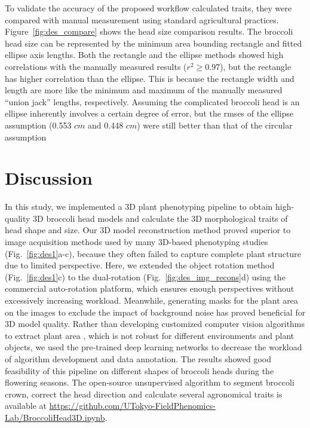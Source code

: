 To validate the accuracy of the proposed workflow calculated traits, they were compared with manual measurement using standard agricultural practices. Figure~\ref{fig:des_compare} shows the head size comparison results. The broccoli head size can be represented by the minimum area bounding rectangle and fitted ellipse axis lengths. Both the rectangle and the ellipse methods showed high correlations with the manually measured results ($r^2 \geq 0.97$), but the rectangle has higher correlation than the ellipse. This is because the rectangle width and length are more like the minimum and maximum of the manually measured ``union jack'' lengths, respectively. Assuming the complicated broccoli head is an ellipse inherently involves a certain degree of error, but the \gls{rmse}s of the ellipse assumption (0.553 $cm$ and 0.448 $cm$) were still better than that of the circular assumption \citep[Table 5, \gls{rmse}=0.97 $cm$]{blok_image_2021}



\section{Discussion}

In this study, we implemented a 3D plant phenotyping pipeline to obtain high-quality 3D broccoli head models and calculate the 3D morphological traits of head shape and size. Our 3D model reconstruction method proved superior to image acquisition methods used by many 3D-based phenotyping studies (Fig.~\ref{fig:des1}a-c), because they often failed to capture complete plant structure due to limited perspective. Here, we extended the object rotation method (Fig.~\ref{fig:des1}c) to the dual-rotation (Fig.~\ref{fig:des_img_recons}d) using the commercial auto-rotation platform, which ensures enough perspectives without excessively increasing workload. Meanwhile, generating masks for the plant area on the images to exclude the impact of background noise has proved beneficial for 3D model quality. Rather than developing customized computer vision algorithms to extract plant area \citep{nguyen_3d_2016,kochi_3d_2018,kochi_all_2022}, which is not robust for different environments and plant objects, we used the pre-trained deep learning networks to decrease the workload of algorithm development and data annotation. The results showed good feasibility of this pipeline on different shapes of broccoli heads during the flowering seasons. The open-source unsupervised algorithm to segment broccoli crown, correct the head direction and calculate several agronomical traits is available at \url{https://github.com/UTokyo-FieldPhenomics-Lab/BroccoliHead3D.ipynb}.

